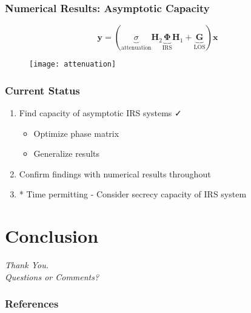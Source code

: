 \documentclass[10pt,tgadventor, onlymath]{beamer}
\begin{document}
\begin{frame}
	\frametitle{Numerical Results: Asymptotic Capacity}
		\begin{equation*}
	\mathbf{y} = (\underbrace{\sigma}_{\text{attenuation}}\mathbf{H}_2\underbrace{\boldsymbol{\Phi}}_{\text{IRS}}\mathbf{H}_1 + \underbrace{\mathbf{G}}_{\text{LOS}})\mathbf{x}
	\end{equation*} 
\begin{figure}
\texttt{[image: attenuation]}
\end{figure}
\end{frame}



\begin{frame}
\frametitle{Current Status}
\begin{enumerate}
\item
	Find capacity of asymptotic IRS systems  \faCheck
	\begin{itemize}
	\item 
		Optimize phase matrix	\faQuestion
	\item
		Generalize results
	\end{itemize}

\item 
	Confirm findings with numerical results throughout
	
\item
	* Time permitting - Consider secrecy capacity of IRS system
\end{enumerate}
\end{frame}


\section{Conclusion}

\begin{frame}
  \centering \Large
  \emph{Thank You.}
  \\
	\bigskip
    \centering \Large
  \emph{Questions or Comments?}

\end{frame}

\begin{frame}[allowframebreaks]
        \frametitle{References}
        
\end{frame}
\end{document}
